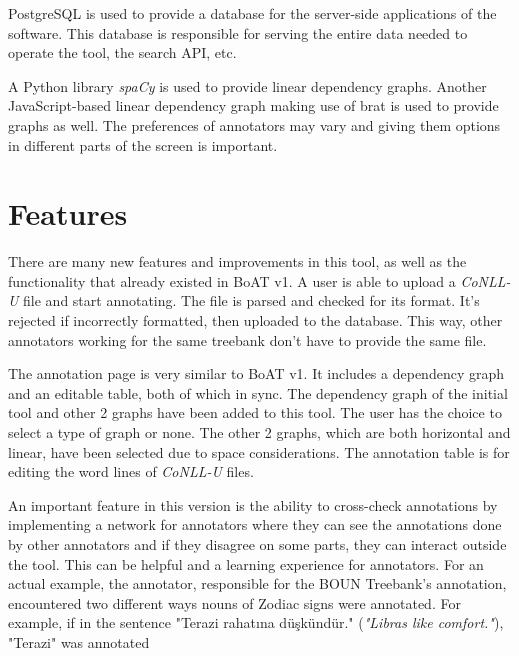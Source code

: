 \documentclass[
]{ceurart}
\begin{document}
PostgreSQL\cite{psql} is used to provide a database for the server-side applications of the software.
This database is responsible for serving the entire data needed to operate the tool, the search API, etc.

A Python library \textit{spaCy}\cite{spacy} is used to provide linear dependency graphs.
Another JavaScript-based linear dependency graph\cite{spyssalo} making use of brat\cite{brat-vis} is used to provide graphs as well.
The preferences of annotators may vary and giving them options in different parts of the screen is important.


\section{Features}
\label{sec:features}

There are many new features and improvements in this tool, as well as the functionality that already existed in BoAT v1.
A user is able to upload a \textit{CoNLL-U} file and start annotating.
The file is parsed and checked for its format. It's rejected if incorrectly formatted, then uploaded to the database.
This way, other annotators working for the same treebank don't have to provide the same file.

The annotation page is very similar to BoAT v1.
It includes a dependency graph and an editable table, both of which in sync.
The dependency graph of the initial tool and other 2 graphs have been added to this tool.
The user has the choice to select a type of graph or none.
The other 2 graphs, which are both horizontal and linear, have been selected due to space considerations.
The annotation table is for editing the word lines of \textit{CoNLL-U} files.

An important feature in this version is the ability to cross-check annotations by implementing a network for annotators where they can see the annotations done by other annotators and if they disagree on some parts, they can interact outside the tool.
This can be helpful and a learning experience for annotators.
For an actual example, the annotator, responsible for the BOUN Treebank's annotation, encountered two different ways nouns of Zodiac signs were annotated.
For example, if in the sentence "Terazi rahatına düşkündür." (\textit{"Libras like comfort."}), "Terazi" was annotated
\end{document}
